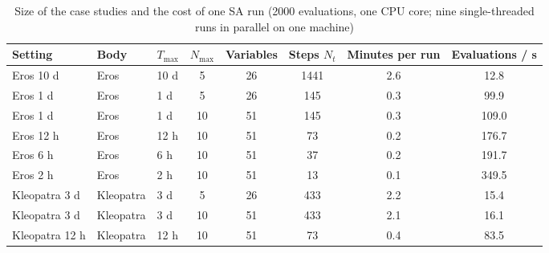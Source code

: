 \begin{table}[htbp]
\centering
\caption{Size of the case studies and the cost of one \ac{SA} run (2000 evaluations, one CPU core; nine single-threaded runs in parallel on one machine)}
\label{tab:cost}
\scriptsize
\begin{tabular}{@{}lllccccc@{}}
\toprule
Setting & Body & $T_{\max}$ & $N_{\max}$ & Variables & Steps $N_t$ & Minutes per run & Evaluations / s \\
\midrule
Eros 10 d & Eros & 10 d & 5 & 26 & 1441 & 2.6 & 12.8 \\
Eros 1 d & Eros & 1 d & 5 & 26 & 145 & 0.3 & 99.9 \\
Eros 1 d & Eros & 1 d & 10 & 51 & 145 & 0.3 & 109.0 \\
Eros 12 h & Eros & 12 h & 10 & 51 & 73 & 0.2 & 176.7 \\
Eros 6 h & Eros & 6 h & 10 & 51 & 37 & 0.2 & 191.7 \\
Eros 2 h & Eros & 2 h & 10 & 51 & 13 & 0.1 & 349.5 \\
Kleopatra 3 d & Kleopatra & 3 d & 5 & 26 & 433 & 2.2 & 15.4 \\
Kleopatra 3 d & Kleopatra & 3 d & 10 & 51 & 433 & 2.1 & 16.1 \\
Kleopatra 12 h & Kleopatra & 12 h & 10 & 51 & 73 & 0.4 & 83.5 \\
\bottomrule
\end{tabular}
\end{table}
